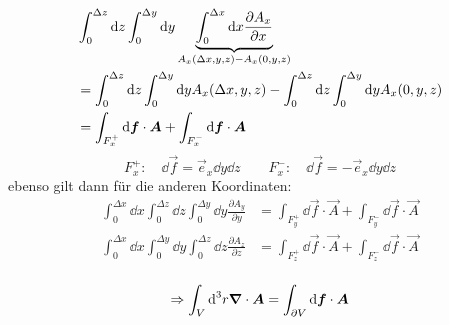 \begin{enumerate}[i)]
\begin{align*}
	\end{align*}
	\begin{align*}
	&\int_{0}^{\Delta z} \textrm{d} z \int_{0}^{\Delta y} \textrm{d} y \underbrace{\int_{0}^{\Delta x} \textrm{d} x \frac{\partial A_x}{\partial x}}_{A_x(\Delta x , y , z) - A_x(0,y,z)}\\
	& = \int_{0}^{\Delta z} \textrm{d} z \int_{0}^{\Delta y} \textrm{d} y A_x(\Delta x,y,z) - \int_{0}^{\Delta z} \textrm{d} z \int_{0}^{\Delta y} \textrm{d} y A_x(0,y,z)\\
	& = \int_{F^+_x} \textrm{d}\bm{f} \cdot \bm{A} + \int_{F^-_x} \textrm{d}\bm{f} \cdot \bm{A}
	\end{align*}
	\begin{equation*}
	F_x^+: \quad \dd\vec{f} = \vec{e}_x \dd y \dd z \qquad F_x^-: \quad \dd\vec{f} = - \vec{e}_x \dd y \dd z
	\end{equation*}
	ebenso gilt dann für die anderen Koordinaten:
	\begin{align*}
	\int_{0}^{\Delta x} \dd x \int_{0}^{\Delta z} \dd z \int_{0}^{\Delta y} \dd y \frac{\partial A_y}{\partial y} &= \int_{F^+_y} \dd\vec{f} \cdot \vec{A} + \int_{F^-_y} \dd\vec{f} \cdot \vec{A} \\
	\int_{0}^{\Delta x} \dd x \int_{0}^{\Delta y} \dd y \int_{0}^{\Delta z} \dd z \frac{\partial A_z}{\partial z} &= \int_{F^+_z} \dd\vec{f} \cdot \vec{A} + \int_{F^-_z} \dd\vec{f} \cdot \vec{A} \\
	\end{align*}
\end{enumerate}

$$\Rightarrow \int_V \textrm{d}^3 r \bm{\nabla} \cdot \bm{A} = \int_{\partial V} \textrm{d} \bm{f} \cdot \bm{A}$$

